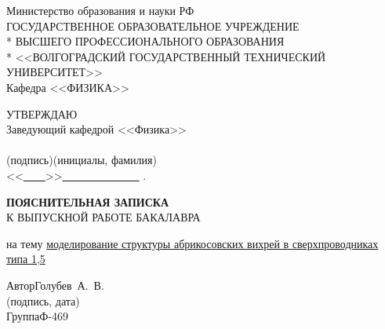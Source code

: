\begin{titlepage}
	\begin{center}
		Министерство образования и науки РФ \\
		\vspace{.5cm}
		ГОСУДАРСТВЕННОЕ ОБРАЗОВАТЕЛЬНОЕ УЧРЕЖДЕНИЕ\\*
		ВЫСШЕГО ПРОФЕССИОНАЛЬНОГО ОБРАЗОВАНИЯ\\*
		<<ВОЛГОГРАДСКИЙ ГОСУДАРСТВЕННЫЙ ТЕХНИЧЕСКИЙ УНИВЕРСИТЕТ>>\\
		\vspace{.5cm}
		Кафедра <<ФИЗИКА>>
		\vspace{.5cm}
	\end{center}
	\begin{flushright}
		УТВЕРЖДАЮ\\
		Заведующий кафедрой <<Физика>>\\
		\vspace{.3cm}
		\underline{\hspace{2cm}}\hspace{1cm}\underline{\hspace{4cm}}\\
		\vspace{-.2cm}\footnotesize(подпись)\hspace{1.8cm}(инициалы, фамилия)
			\hspace*{.2cm}\ \normalsize\\
		\vspace{.3cm}
		<<\underline{\ \ \ \ }>>\underline{\ \ \ \ \ \ \ \ \ \ \ \ \ \ } 
			\the{}.
	\end{flushright}
	\begin{center}
		\LARGE \textbf{ПОЯСНИТЕЛЬНАЯ ЗАПИСКА} \\
		\large К ВЫПУСКНОЙ РАБОТЕ БАКАЛАВРА
	\end{center}
	\begin{center}
		на тему \underline{моделирование структуры абрикосовских вихрей в 
        	сверхпроводниках типа 1,5}
	\end{center}
	\begin{flushleft}
		Автор\hspace{2.5cm}Голубев~А.~В.\hfill\underline{\hspace{5cm}}\\
		\vspace{-.2cm}\hspace{14cm}\footnotesize(подпись, дата)\normalsize\\
		\vspace{-.5cm}
		Группа\hspace{2.2cm}Ф-469\\

\end{flushleft}
\end{titlepage}
